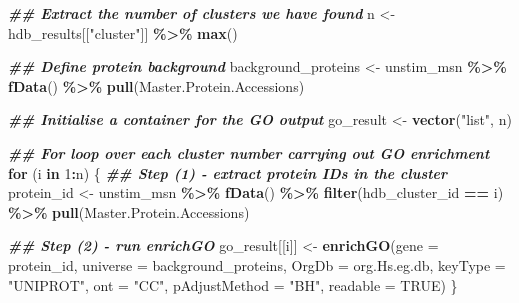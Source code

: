 \documentclass[9pt,a4paper,]{extarticle}
\newenvironment{Shaded}{\begin{snugshade}}{\end{snugshade}}
\newcommand{\AttributeTok}[1]{\textcolor[rgb]{0.13,0.29,0.53}{#1}}
\newcommand{\ConstantTok}[1]{\textcolor[rgb]{0.56,0.35,0.01}{#1}}
\newcommand{\ControlFlowTok}[1]{\textcolor[rgb]{0.13,0.29,0.53}{\textbf{#1}}}
\newcommand{\DecValTok}[1]{\textcolor[rgb]{0.00,0.00,0.81}{#1}}
\newcommand{\DocumentationTok}[1]{\textcolor[rgb]{0.56,0.35,0.01}{\textbf{\textit{#1}}}}
\newcommand{\FunctionTok}[1]{\textcolor[rgb]{0.13,0.29,0.53}{\textbf{#1}}}
\newcommand{\NormalTok}[1]{#1}
\newcommand{\OtherTok}[1]{\textcolor[rgb]{0.56,0.35,0.01}{#1}}
\newcommand{\SpecialCharTok}[1]{\textcolor[rgb]{0.81,0.36,0.00}{\textbf{#1}}}
\newcommand{\StringTok}[1]{\textcolor[rgb]{0.31,0.60,0.02}{#1}}
\begin{document}
\begin{Shaded}
\begin{Highlighting}[]
\DocumentationTok{\#\# Extract the number of clusters we have found}
\NormalTok{n }\OtherTok{\textless{}{-}}\NormalTok{ hdb\_results[[}\StringTok{"cluster"}\NormalTok{]] }\SpecialCharTok{\%\textgreater{}\%}
  \FunctionTok{max}\NormalTok{()}
  
\DocumentationTok{\#\# Define protein background}
\NormalTok{background\_proteins }\OtherTok{\textless{}{-}}\NormalTok{ unstim\_msn }\SpecialCharTok{\%\textgreater{}\%}
  \FunctionTok{fData}\NormalTok{() }\SpecialCharTok{\%\textgreater{}\%}
  \FunctionTok{pull}\NormalTok{(Master.Protein.Accessions)}
\end{Highlighting}
\end{Shaded}

\begin{Shaded}
\begin{Highlighting}[]
\DocumentationTok{\#\# Initialise a container for the GO output}
\NormalTok{go\_result }\OtherTok{\textless{}{-}} \FunctionTok{vector}\NormalTok{(}\StringTok{"list"}\NormalTok{, n)}

\DocumentationTok{\#\# For loop over each cluster number carrying out GO enrichment}
\ControlFlowTok{for}\NormalTok{ (i }\ControlFlowTok{in} \DecValTok{1}\SpecialCharTok{:}\NormalTok{n) \{}
  \DocumentationTok{\#\# Step (1) {-} extract protein IDs in the cluster}
\NormalTok{  protein\_id }\OtherTok{\textless{}{-}}\NormalTok{ unstim\_msn }\SpecialCharTok{\%\textgreater{}\%}
    \FunctionTok{fData}\NormalTok{() }\SpecialCharTok{\%\textgreater{}\%}
    \FunctionTok{filter}\NormalTok{(hdb\_cluster\_id }\SpecialCharTok{==}\NormalTok{ i) }\SpecialCharTok{\%\textgreater{}\%}
    \FunctionTok{pull}\NormalTok{(Master.Protein.Accessions)}
  
  \DocumentationTok{\#\# Step (2) {-} run enrichGO}
\NormalTok{  go\_result[[i]] }\OtherTok{\textless{}{-}} \FunctionTok{enrichGO}\NormalTok{(}\AttributeTok{gene =}\NormalTok{ protein\_id,}
                        \AttributeTok{universe =}\NormalTok{ background\_proteins,}
                        \AttributeTok{OrgDb =}\NormalTok{ org.Hs.eg.db,}
                        \AttributeTok{keyType =} \StringTok{"UNIPROT"}\NormalTok{,}
                        \AttributeTok{ont =} \StringTok{"CC"}\NormalTok{,}
                        \AttributeTok{pAdjustMethod =} \StringTok{"BH"}\NormalTok{,}
                        \AttributeTok{readable =} \ConstantTok{TRUE}\NormalTok{)}
\NormalTok{\}}
\end{Highlighting}
\end{Shaded}
\end{document}
